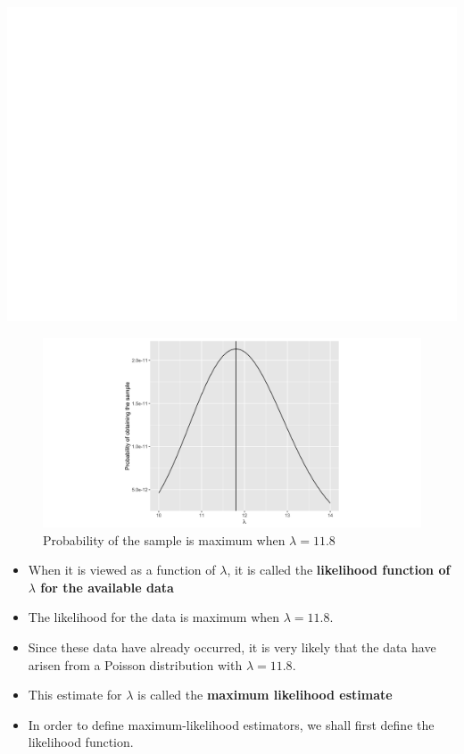 \documentclass[]{book}
\begin{document}
\begin{center}\includegraphics[width=1\linewidth]{figure/Ch2box2-1} \end{center}

\begin{figure}

{\centering \includegraphics{figure/joint-1} 

}

\caption{Probability of the sample is maximum when $\lambda = 11.8$}\label{fig:joint}
\end{figure}

\begin{itemize}
\item
  When it is viewed as a function of \(\lambda\), it is called the \textbf{likelihood function of \(\lambda\) for the available data}
\item
  The likelihood for the data is maximum when \(\lambda = 11.8.\)
\item
  Since these data have already occurred, it is very likely that the data have arisen from a Poisson distribution with \(\lambda =11.8\).
\item
  This estimate for \(\lambda\) is called the \textbf{maximum likelihood estimate}
\item
  In order to define maximum-likelihood estimators, we shall first define the likelihood function.
\end{itemize}
\end{document}
